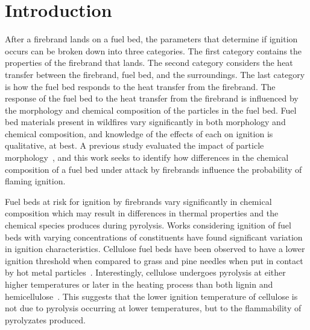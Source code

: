\section{Introduction}\addvspace{10pt}
\label{sec:introduction3}
    
    After a firebrand lands on a fuel bed, the parameters that determine if ignition occurs can be broken down into three categories. The first category contains the properties of the firebrand that lands. The second category considers the heat transfer between the firebrand, fuel bed, and the surroundings. The last category is how the fuel bed responds to the heat transfer from the firebrand. The response of the fuel bed to the heat transfer from the firebrand is influenced by the morphology and chemical composition of the particles in the fuel bed. Fuel bed materials present in wildfires vary significantly in both morphology and chemical composition, and knowledge of the effects of each on ignition is qualitative, at best. A previous study evaluated the impact of particle morphology~\cite{Bean2021}, and this work seeks to identify how differences in the chemical composition of a fuel bed under attack by firebrands influence the probability of flaming ignition. 
    
    Fuel beds at risk for ignition by firebrands vary significantly in chemical composition which may result in differences in thermal properties and the chemical species produces during pyrolysis. Works considering ignition of fuel beds with varying concentrations of constituents have found significant variation in ignition characteristics. Cellulose fuel beds have been observed to have a lower ignition threshold when compared to grass and pine needles when put in contact by hot metal particles~\cite{Urban2018}. Interestingly, cellulose undergoes pyrolysis at either higher temperatures or later in the heating process than both lignin and hemicellulose~\cite{Yang2007a, Shotorban2018}. This suggests that the lower ignition temperature of cellulose is not due to pyrolysis occurring at lower temperatures, but to the flammability of pyrolyzates produced. 
    

